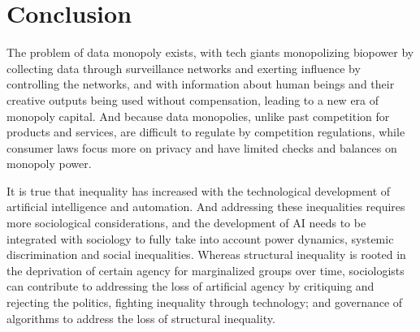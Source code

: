 \documentclass[11pt]{article}
\begin{document}
\section{Conclusion}

The problem of data monopoly exists, with tech giants monopolizing biopower by collecting data through surveillance networks and exerting influence by controlling the networks, and with information about human beings and their creative outputs being used without compensation, leading to a new era of monopoly capital. And because data monopolies, unlike past competition for products and services, are difficult to regulate by competition regulations, while consumer laws focus more on privacy and have limited checks and balances on monopoly power.

It is true that inequality has increased with the technological development of artificial intelligence and automation. And addressing these inequalities requires more sociological considerations, and the development of AI needs to be integrated with sociology to fully take into account power dynamics, systemic discrimination and social inequalities. Whereas structural inequality is rooted in the deprivation of certain agency for marginalized groups over time, sociologists can contribute to addressing the loss of artificial agency by critiquing and rejecting the politics, fighting inequality through technology; and governance of algorithms to address the loss of structural inequality.
\end{document}
